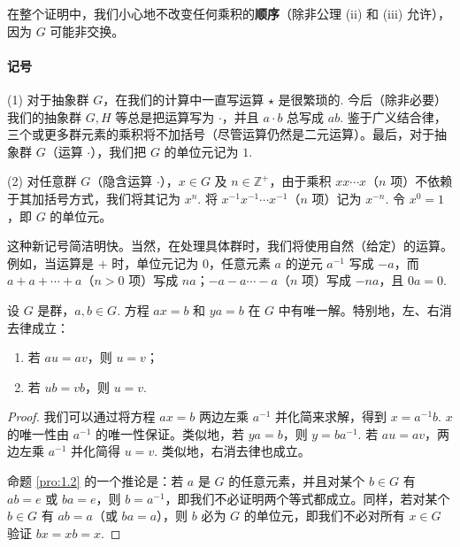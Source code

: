 在整个证明中，我们小心地不改变任何乘积的\textbf{顺序}（除非公理 (ii) 和 (iii) 允许），因为 \(G\) 可能非交换。

\paragraph{记号}
(1) 对于抽象群 \( G \)，在我们的计算中一直写运算 \(\star\) 是很繁琐的. 今后（除非必要）我们的抽象群 \( G, H \) 等总是把运算写为 \(\cdot\)，并且 \( a \cdot b \) 总写成 \( ab \). 鉴于广义结合律，三个或更多群元素的乘积将不加括号（尽管运算仍然是二元运算）。最后，对于抽象群 \( G \)（运算 \(\cdot\)），我们把 \( G \) 的单位元记为 \( 1 \).

(2) 对任意群 \( G \)（隐含运算 \(\cdot\)），\( x \in G \) 及 \( n \in \mathbb{Z}^+ \)，由于乘积 \( xx\cdots x \)（\( n \) 项）不依赖于其加括号方式，我们将其记为 \( x^n \). 将 \( x^{-1}x^{-1}\cdots x^{-1} \)（\( n \) 项）记为 \( x^{-n} \). 令 \( x^0 = 1 \)，即 \( G \) 的单位元。

这种新记号简洁明快。当然，在处理具体群时，我们将使用自然（给定）的运算。例如，当运算是 \(+\) 时，单位元记为 \( 0 \)，任意元素 \( a \) 的逆元 \( a^{-1} \) 写成 \( -a \)，而 \( a + a + \cdots + a \)（\( n > 0 \) 项）写成 \( na \)；\( -a - a \cdots - a \)（\( n \) 项）写成 \( -na \)，且 \( 0a = 0 \).

\begin{proposition}
\label{pro:1.2}
设 \(G\) 是群，\(a, b \in G\). 方程 \(ax = b\) 和 \(ya = b\) 在 \(G\) 中有唯一解。特别地，左、右消去律成立：
\begin{enumerate}
\item[(1)] 若 \(au = av\)，则 \(u = v\)；
\item[(2)] 若 \(ub = vb\)，则 \(u = v\).
\end{enumerate}
\end{proposition}

\begin{proof}
我们可以通过将方程 \( ax = b \) 两边左乘 \( a^{-1} \) 并化简来求解，得到 \( x = a^{-1}b \). \( x \) 的唯一性由 \( a^{-1} \) 的唯一性保证。类似地，若 \( ya = b \)，则 \( y = ba^{-1} \). 若 \( au = av \)，两边左乘 \( a^{-1} \) 并化简得 \( u = v \). 类似地，右消去律也成立。

命题 \ref{pro:1.2} 的一个推论是：若 \( a \) 是 \( G \) 的任意元素，并且对某个 \( b \in G \) 有 \( ab = e \) 或 \( ba = e \)，则 \( b = a^{-1} \)，即我们不必证明两个等式都成立。同样，若对某个 \( b \in G \) 有 \( ab = a \)（或 \( ba = a \)），则 \( b \) 必为 \( G \) 的单位元，即我们不必对所有 \( x \in G \) 验证 \( bx = xb = x \).
\end{proof}

